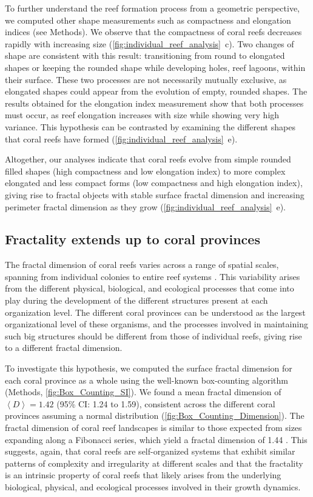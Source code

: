 To further understand the reef formation process from a geometric
perspective, we computed other shape measurements such as compactness and
elongation indices (see Methods). We observe that the compactness of coral
reefs decreases rapidly with increasing size
(\cref{fig:individual_reef_analysis}~\textcolor{ref_color}{c}). Two changes of
shape are consistent
with this result: transitioning from round to elongated shapes or keeping the
rounded shape while developing holes, reef lagoons, within their surface. These
two processes are not necessarily mutually exclusive, as elongated shapes could
appear from the evolution of empty, rounded shapes. The results obtained for
the elongation index measurement show that both processes must occur, as reef
elongation increases with size while showing very high variance. This
hypothesis can be contrasted by examining the different shapes that coral reefs
have formed (\cref{fig:individual_reef_analysis}~\textcolor{ref_color}{e}).

Altogether, our analyses indicate that coral reefs evolve from simple
rounded filled shapes (high compactness and low elongation index) to more
complex elongated and less compact forms (low compactness and high elongation
index), giving rise to fractal objects with stable surface fractal dimension
and increasing perimeter fractal dimension as they grow
(\cref{fig:individual_reef_analysis}~\textcolor{ref_color}{e}).

\subsection{Fractality extends up to coral provinces}

The fractal dimension of coral reefs varies across a range of spatial
scales, spanning from individual colonies to entire reef systems
\cite{George2021}. This variability arises from the different physical,
biological, and ecological processes that come into play during the development
of the different structures present at each organization level. The different
coral provinces can be understood as the largest organizational level of these
organisms, and the processes involved in maintaining such big structures should
be different from those of individual reefs, giving rise to a different fractal
dimension.

To investigate this hypothesis, we computed the surface fractal dimension
for each coral province as a whole using the well-known box-counting algorithm
(Methods, \cref{fig:Box_Counting_SI}). We found a mean fractal dimension
of $\left<D\right>=1.42$ (95\% CI: 1.24 to 1.59), consistent across the
different coral provinces assuming a normal distribution
(\cref{fig:Box_Counting_Dimension}). The fractal dimension of coral reef
landscapes is similar to those expected from sizes expanding along a Fibonacci
series, which yield a fractal dimension of 1.44 \cite{Sorensen1998}. This
suggests, again, that coral reefs are self-organized systems that exhibit
similar patterns of complexity and irregularity at different scales and that
the fractality is an intrinsic property of coral reefs that likely arises from
the underlying biological, physical, and ecological processes involved in their
growth dynamics.

